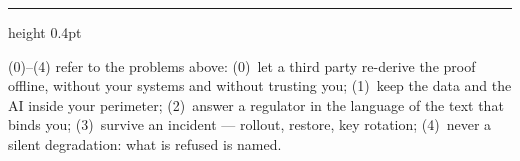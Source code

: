 \documentclass[11pt]{article}
\begin{document}
\enlargethispage{4\baselineskip}
\vspace{4pt}
{\color{efegray}\hrule height 0.4pt}
\vspace{2.5pt}
{\footnotesize\color{efegray}(0)--(4) refer to the problems above: (0)~let a third party re-derive the proof offline, without your systems and without trusting you; (1)~keep the data and the AI inside your perimeter; (2)~answer a regulator in the language of the text that binds you; (3)~survive an incident --- rollout, restore, key rotation; (4)~never a silent degradation: what is refused is named.}
\end{document}

